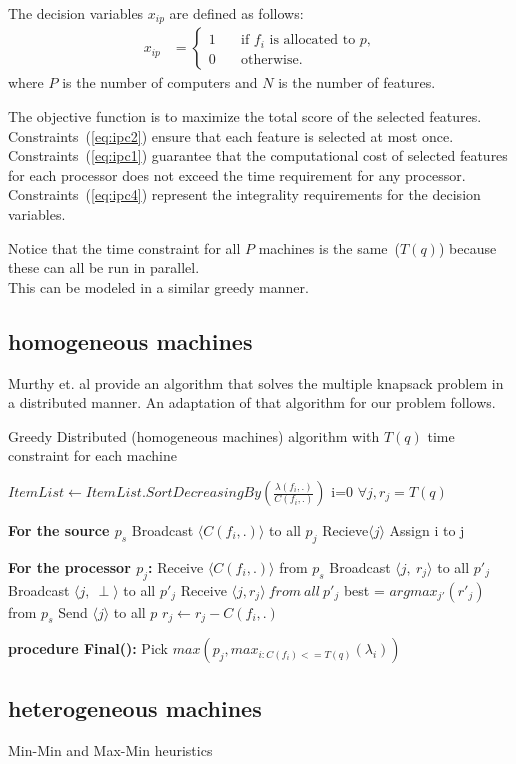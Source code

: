 \documentclass[10pt, conference, compsocconf]{IEEEtran}
\begin{document}
The decision variables $x_{ip}$ are defined as follows:
\begin{align} x_{ip} &=
\begin{cases} 
1 & \quad \text{if $f_i$ is allocated to $p$,}\\
0 & \quad \text{otherwise.}
\end{cases} 
\end{align} 
where $P$ is the number of computers and $N$ is the number of features. 

The objective function is to maximize the total score of the selected features. 
Constraints~(\ref{eq:ipc2}) ensure that each feature is selected at most once. 
Constraints~(\ref{eq:ipc1}) guarantee that 
the computational cost of selected features for each processor does 
not exceed the time requirement for any processor.
Constraints~(\ref{eq:ipc4}) 
represent the integrality requirements for the decision variables. 

Notice that the time constraint for all $P$ machines is the same~($T(q)$) because these can all be run in parallel.\\
This can be modeled in a similar greedy manner.

\subsection{homogeneous machines}
Murthy et. al \cite{murthy2017distributed} provide an algorithm that solves the multiple knapsack problem in a distributed manner.
An adaptation of that algorithm for our problem follows.
\begin{algorithm}[H]
 \caption{Greedy Distributed (homogeneous machines) algorithm with $T(q)$ time constraint for each machine }
 \begin{algorithmic}[1]
 \renewcommand{\algorithmicrequire}{\textbf{Input:}}
 \renewcommand{\algorithmicensure}{\textbf{Output:}}
  \STATE $ItemList \leftarrow ItemList.SortDecreasingBy(\frac{\lambda(f_i, .)}{C(f_i, .)})$
\STATE i=0
\STATE $\forall j, r_j = T(q)$

\textbf{For the source $p_s$}
  \STATE Broadcast $\langle C(f_i, .)\rangle$ to all $p_j$
\STATE Recieve$ \langle j \rangle$
\STATE Assign i to j
\ENDFOR

\textbf{For the processor $p_j$:}
\STATE Receive $\langle C(f_i, .) \rangle$ from $p_s$
\STATE Broadcast $\langle j,\ r_j \rangle$  to all $ p'_j$
\ELSE 
\STATE Broadcast $\langle j,\ \perp \rangle$  to all $ p'_j$
\ENDIF
\STATE Receive $\langle j, r_j \rangle\ from\ all\ p'_j$
best = $argmax_{j'}(r'_j)$ from $p_s$
\STATE Send $\langle j \rangle$ to all $p$
\STATE $r_j \leftarrow r_j -C(f_i, .)$
\ENDIF

 \textbf{procedure Final():}
\STATE Pick $max(p_j, max_{i:C(f_i)<= T(q)}(\lambda_i) )$
\ENDFOR 
 \end{algorithmic}
 \end{algorithm}
\subsection{heterogeneous machines}
Min-Min and Max-Min heuristics

{\tiny
\newcommand{\BIBdecl}{\setlength{\itemsep}{0.2 em}}


}

\end{document}
